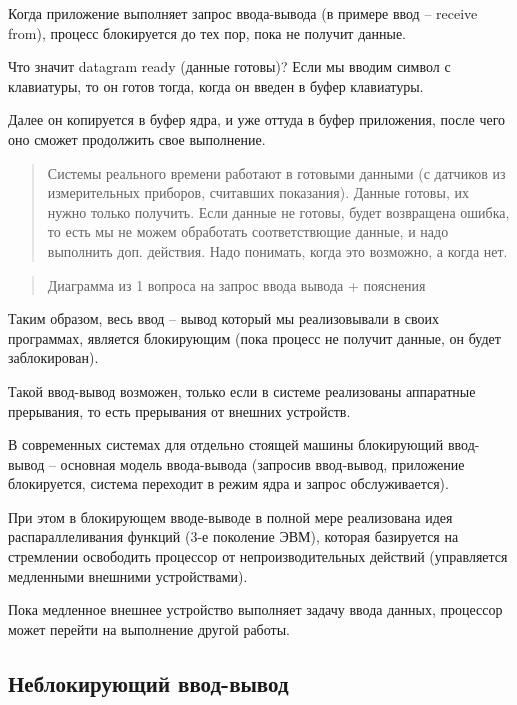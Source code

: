 Когда приложение выполняет запрос ввода-вывода (в примере ввод – receive from), процесс блокируется до тех пор, пока не получит данные.

Что значит datagram ready (данные готовы)? Если мы вводим символ с клавиатуры, то он готов тогда, когда он введен в буфер клавиатуры.

Далее он копируется в буфер ядра, и уже оттуда в буфер приложения, после чего оно сможет продолжить свое выполнение.

\begin{quote}
Системы реального времени работают в готовыми данными (с датчиков из измерительных приборов, считавших показания). Данные готовы, их нужно только получить. Если данные не готовы, будет возвращена ошибка, то есть мы не можем обработать соответствющие данные, и надо выполнить доп. действия. Надо понимать, когда это возможно, а когда нет.
\end{quote}

\begin{quote}
Диаграмма из 1 вопроса на запрос ввода вывода + пояснения
\end{quote}

Таким образом, весь ввод – вывод который мы реализовывали в своих программах, является блокирующим (пока процесс не получит данные, он будет заблокирован). 

Такой ввод-вывод возможен, только если в системе реализованы аппаратные прерывания, то есть прерывания от внешних устройств. 

В современных системах для отдельно стоящей машины блокирующий ввод-вывод – основная модель ввода-вывода (запросив ввод-вывод, приложение блокируется, система переходит в режим ядра и запрос обслуживается).

При этом в блокирующем вводе-выводе в полной мере реализована идея распараллеливания функций (3-е поколение ЭВМ), которая базируется на стремлении освободить процессор от непроизводительных действий (управляется медленными внешними устройствами).

Пока медленное внешнее устройство выполняет задачу ввода данных, процессор может перейти на выполнение другой работы.

\subsection{Неблокирующий ввод-вывод}

